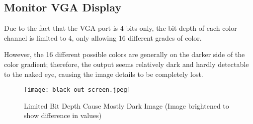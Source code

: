 \subsection{Monitor VGA Display}
\par Due to the fact that the VGA port is 4 bits only, the bit depth of each color channel is limited to 4, only allowing 16 different grades of color. \newline
\par However, the 16 different possible colors are generally on the darker side of the color gradient; therefore, the output seems relatively dark and hardly detectable to the naked eye, causing the image details to be completely lost. \newline

\begin{figure}[H]
	\centering
	\texttt{[image: black out screen.jpeg]}
	\caption{ Limited Bit Depth Cause Mostly Dark Image (Image brightened to show difference in values) }
	\label{fig:screenblack}  
\end{figure}

%